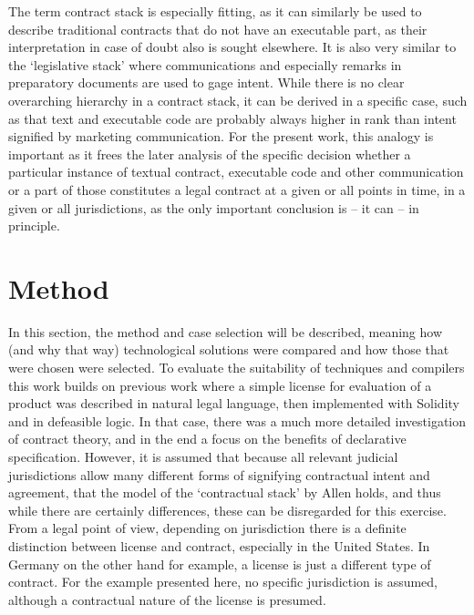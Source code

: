 \documentclass{article}
\begin{document}
The term contract stack is especially fitting, as it can similarly be used to describe traditional contracts that do not have an executable part, as their interpretation in case of doubt also is sought elsewhere. It is also very similar to the ‘legislative stack’ where communications and especially remarks in preparatory documents are used to gage intent. While there is no clear overarching hierarchy in a contract stack, 
it can be derived in a specific case, such as that text and executable code are probably always higher in rank than intent signified by marketing communication. 
For the present work, this analogy is important as it frees the later analysis of the specific decision whether a particular instance of textual contract, executable code and other communication or a part of those constitutes a legal contract at a given or all points in time, in a given or all jurisdictions, as the only important conclusion is – it can  – in principle.

\section{Method}

In this section, the method and case selection will be described, meaning how (and why that way) technological solutions were compared and how those that were chosen were selected.
To evaluate the suitability of techniques and compilers this work builds on previous work  where a simple license for evaluation of a product was described in natural legal language, then implemented with Solidity and in defeasible logic. In that case, there was a much more detailed investigation of contract theory, and in the end a focus on the benefits of declarative specification. \cite{governatoriLegalContractsImperative2018} However, it is assumed that because all relevant judicial jurisdictions allow many different forms of signifying contractual intent and agreement, that the model of the ‘contractual stack’ by Allen \cite{allenWrappedStackedSmart2018} holds, and thus while there %
are certainly differences, 
these can be disregarded for this exercise.
From a legal point of view, depending on jurisdiction there is a definite distinction between license and contract, especially in the United States.
In Germany on the other hand for example, a license is just a different type of contract. For the example presented here, no specific jurisdiction is assumed, although a contractual nature of the license is presumed. \cite{guadamuzComparativeAnalysisCopyright2013}
\end{document}
